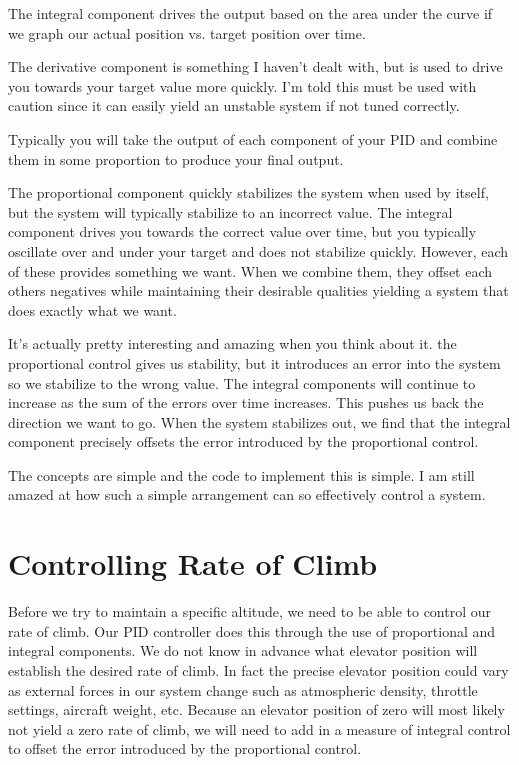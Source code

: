 \documentclass[12pt]{article}
\begin{document}
The integral component drives the output based on the area under the
curve if we graph our actual position vs. target position over time.

The derivative component is something I haven't dealt with, but is
used to drive you towards your target value more quickly.  I'm told
this must be used with caution since it can easily yield an unstable
system if not tuned correctly.

Typically you will take the output of each component of your PID and
combine them in some proportion to produce your final output.

The proportional component quickly stabilizes the system when used by
itself, but the system will typically stabilize to an incorrect value.
The integral component drives you towards the correct value over time,
but you typically oscillate over and under your target and does not
stabilize quickly.  However, each of these provides something we want.
When we combine them, they offset each others negatives while
maintaining their desirable qualities yielding a system that does
exactly what we want.

It's actually pretty interesting and amazing when you think about it.
the proportional control gives us stability, but it introduces an
error into the system so we stabilize to the wrong value.  The
integral components will continue to increase as the sum of the errors
over time increases.  This pushes us back the direction we want to
go.  When the system stabilizes out, we find that the integral
component precisely offsets the error introduced by the proportional
control.

The concepts are simple and the code to implement this is simple.  I
am still amazed at how such a simple arrangement can so effectively
control a system.


\section{Controlling Rate of Climb}

Before we try to maintain a specific altitude, we need to be able to
control our rate of climb.  Our PID controller does this through the
use of proportional and integral components.  We do not know in
advance what elevator position will establish the desired rate of
climb.  In fact the precise elevator position could vary as external
forces in our system change such as atmospheric density, throttle
settings, aircraft weight, etc.  Because an elevator position of zero
will most likely not yield a zero rate of climb, we will need to add
in a measure of integral control to offset the error introduced by the
proportional control.
\end{document}
